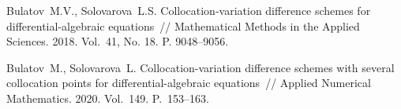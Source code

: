 
%



\begin{thebibliography}{9} %

 Bulatov~M.V., Solovarova~L.S. Collocation-variation difference schemes for differential-algebraic equations~// Mathematical Methods in the Applied Sciences. 2018. Vol.~41, No. 18. P. 9048--9056.

 Bulatov~M., Solovarova~L. Collocation-variation difference schemes with several collocation points for differential-algebraic equations~// Applied Numerical Mathematics. 2020. Vol.~149. P.~153--163. 

\end{thebibliography}





%

